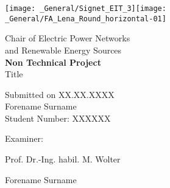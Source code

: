 %
\begin{titlepage}
    \begin{center}
        \texttt{[image: \_General/Signet\_EIT\_3]}\hspace{0.5cm}\texttt{[image: \_General/FA\_Lena\_Round\_horizontal-01]}

        \vspace{1.5cm} %
        \huge
        Chair of Electric Power Networks \\
        and Renewable Energy Sources \\
        \vspace{1.5cm} %
        \huge
        \textbf{Non Technical Project} \\
        \vspace{1.5cm} %
        \Large
        Title  \\
        \vspace{1cm} %
    \end{center}    
    \normalsize
    \vfill %
    Submitted on XX.XX.XXXX \\
    Forename Surname \\
    Student Number: XXXXXX \\
    \begin{labeling}{Examiner: }
        \item[Examiner:]\tabto{1.5cm} Prof. Dr.-Ing. habil. M. Wolter
        \item
        \item[Supervisor:]\tabto{1.5cm} Forename Surname
    \end{labeling}
\end{titlepage}
